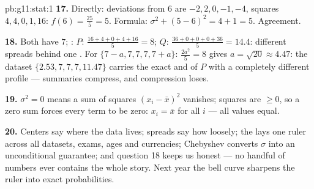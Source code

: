 \begin{solution}{pb:g11:stat:1}
\textbf{17.} Directly: deviations from $6$ are
$-2, 2, 0, -1, -4$, squares $4, 4, 0, 1, 16$:
$f(6) = \frac{25}{5} = 5$. Formula:
$\sigma^2 + (5 - 6)^2 = 4 + 1 = 5$. Agreement.

\textbf{18.} Both have  $7$; :
$P$: $\frac{16 + 4 + 0 + 4 + 16}{5} = 8$;
$Q$: $\frac{36 + 0 + 0 + 0 + 36}{5} = 14.4$: different spreads
behind one . For $\{7 - a, 7, 7, 7, 7 + a\}$: 
$\frac{2a^2}{5} = 8$ gives $a = \sqrt{20} \approx 4.47$: the
dataset $\{2.53, 7, 7, 7, 11.47\}$ carries the exact  and
 of $P$ with a completely different profile ---
summaries compress, and compression loses.

\textbf{19.} $\sigma^2 = 0$ means a sum of squares
$(x_i - \bar x)^2$ vanishes; squares are $\geq 0$, so a zero
sum forces every term to be zero: $x_i = \bar x$ for all $i$
--- all values equal.

\textbf{20.} Centers say where the data lives; spreads say how
loosely; the  lays one ruler across all datasets,
exams, ages and currencies; Chebyshev converts $\sigma$ into
an unconditional guarantee; and question 18 keeps us honest
--- no handful of numbers ever contains the whole story. Next
year the bell curve sharpens the ruler into exact
probabilities.
\end{solution}
